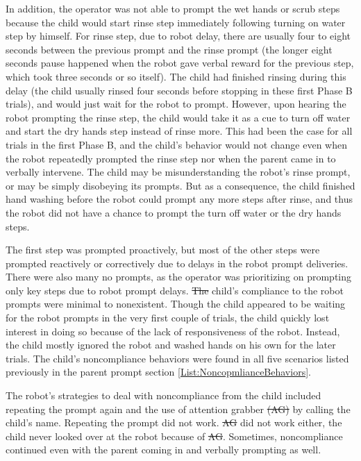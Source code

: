 \documentclass{ut-thesis}
\providecommand{\DIFaddtex}[1]{{\protect\color{blue}\uwave{#1}}} %
\providecommand{\DIFdeltex}[1]{{\protect\color{red}\sout{#1}}}                      %
\providecommand{\DIFaddbegin}{} %
\providecommand{\DIFaddend}{} %
\providecommand{\DIFdelbegin}{} %
\providecommand{\DIFdelend}{} %
\providecommand{\DIFadd}[1]{\texorpdfstring{\DIFaddtex{#1}}{#1}} %
\providecommand{\DIFdel}[1]{\texorpdfstring{\DIFdeltex{#1}}{}} %
\begin{document}
In addition, the operator was not able to prompt the wet hands or scrub steps because the child would start rinse step immediately following turning on water step by himself.  For rinse step, due to robot delay, there are usually four to eight seconds between the previous prompt and the rinse prompt (the longer eight seconds pause happened when the robot gave verbal reward for the previous step, which took three seconds or so itself).  The child had finished rinsing during this delay (the child usually rinsed four seconds before stopping in these first Phase B trials), and would just wait for the robot to prompt.  However, upon hearing the robot prompting the rinse step, the child would take it as a cue to turn off water and start the dry hands step instead of rinse more.  This had been the case for all trials in the first Phase B, and the child's behavior would not change even when the robot repeatedly prompted the rinse step nor when the parent came in to verbally intervene.  The child may be misunderstanding the robot's rinse prompt, or may be simply disobeying its prompts.  But as a consequence, the child finished hand washing before the robot could prompt any more steps after rinse, and thus the robot did not have a chance to prompt the turn off water or the dry hands steps.

The first step was prompted proactively, but most of the other steps were prompted reactively or correctively due to delays in the robot prompt deliveries.  There were also many no prompts, as the operator was prioritizing on prompting only key steps due to robot prompt delays.  \DIFdelbegin \DIFdel{The }\DIFdelend \DIFaddbegin \DIFadd{In this phase, the }\DIFaddend child's compliance to the robot prompts were minimal to nonexistent.  Though the child appeared to be waiting for the robot prompts in the very first couple of trials, the child quickly lost interest in doing so because of the lack of responsiveness of the robot.  Instead, the child mostly ignored the robot and washed hands on his own for the later trials.  The child's noncompliance behaviors were found in all five scenarios listed previously in the parent prompt section \ref{List:NoncopmlianceBehaviors}.

The robot's strategies to deal with noncompliance from the child included repeating the prompt again and the use of attention grabber \DIFdelbegin \DIFdel{(AG) }\DIFdelend by calling the child's name.  Repeating the prompt did not work.  \DIFdelbegin \DIFdel{AG }\DIFdelend \DIFaddbegin \DIFadd{Attention grabber }\DIFaddend did not work either, the child never looked over at the robot because of \DIFdelbegin \DIFdel{AG}\DIFdelend \DIFaddbegin \DIFadd{attention grabber}\DIFaddend .  Sometimes, noncompliance continued even with the parent coming in and verbally prompting as well.
\end{document}
